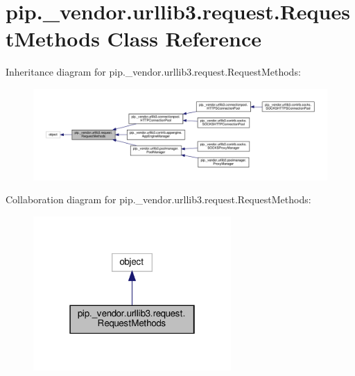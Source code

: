 \hypertarget{classpip_1_1__vendor_1_1urllib3_1_1request_1_1RequestMethods}{}\section{pip.\+\_\+vendor.\+urllib3.\+request.\+Request\+Methods Class Reference}
\label{classpip_1_1__vendor_1_1urllib3_1_1request_1_1RequestMethods}


Inheritance diagram for pip.\+\_\+vendor.\+urllib3.\+request.\+Request\+Methods\+:
\nopagebreak
\begin{figure}[H]
\begin{center}
\leavevmode
\includegraphics[width=350pt]{classpip_1_1__vendor_1_1urllib3_1_1request_1_1RequestMethods__inherit__graph}
\end{center}
\end{figure}


Collaboration diagram for pip.\+\_\+vendor.\+urllib3.\+request.\+Request\+Methods\+:
\nopagebreak
\begin{figure}[H]
\begin{center}
\leavevmode
\includegraphics[width=214pt]{classpip_1_1__vendor_1_1urllib3_1_1request_1_1RequestMethods__coll__graph}
\end{center}
\end{figure}
